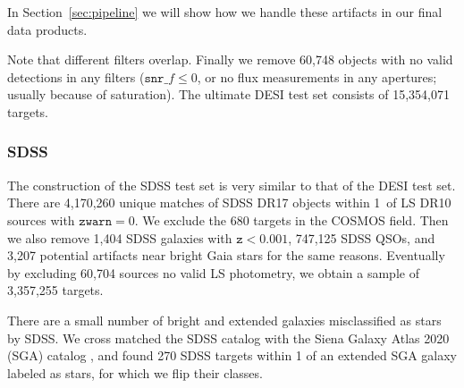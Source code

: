 \documentclass[twocolumn,tighten]{aastex631}
\newcommand{\dr}[1]{DR{#1}}
\begin{document}
\begin{CJK*}{UTF8}{gbsn}
\begin{itemize}
    In Section~\ref{sec:pipeline} we will show how we handle these artifacts in our final data products.
\end{itemize}
Note that different filters overlap. Finally we remove 60,748 objects with no valid detections in any filters ($\texttt{snr\_}f \le 0$, or no flux measurements in any apertures; usually because of saturation). The ultimate DESI test set consists of 15,354,071 targets.

\subsubsection{SDSS}\label{sec:SDSS}
The construction of the SDSS test set is very similar to that of the DESI test set. There are 4,170,260 unique matches of SDSS \dr{17} objects within 1\arcsec\ of LS \dr{10} sources with $\texttt{zwarn}=0$. We exclude the 680 targets in the COSMOS field. Then we also remove 1,404 SDSS galaxies with $\texttt{z}<0.001$, 747,125 SDSS QSOs, and 3,207 potential artifacts near bright Gaia stars for the same reasons. Eventually by excluding 60,704 sources no valid LS photometry, we obtain a sample of 3,357,255 targets.

There are a small number of bright and extended galaxies misclassified as stars by SDSS. We cross matched the SDSS catalog with the Siena Galaxy Atlas 2020 (SGA) catalog \citep{SGA_2023}, and found 270 SDSS targets within 1 of an extended SGA galaxy labeled as stars, for which we flip their classes.


\end{CJK*}
\end{document}
